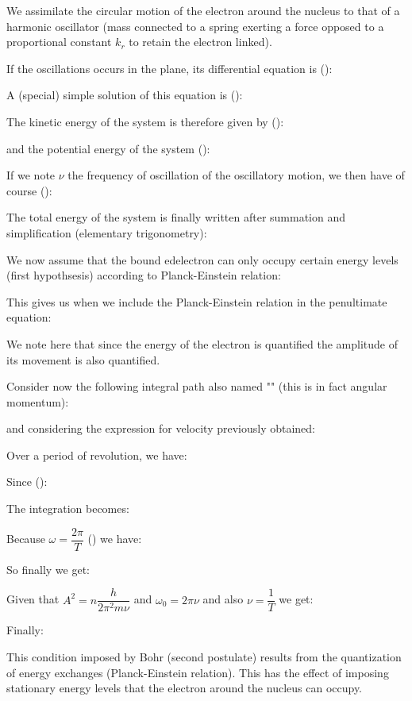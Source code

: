 We assimilate the circular motion of the electron around the nucleus to that of a harmonic oscillator (mass connected to a spring exerting a force opposed to a proportional constant $k_r$ to retain the  electron linked).

If the oscillations occurs in the plane, its differential equation is ():
	
A (special) simple solution of this equation is ():
	
The kinetic energy of the system is therefore given  by ():
	
and the potential energy of the system ():
	
If we note $\nu$ the frequency of oscillation of the oscillatory motion, we then have of course ():
	
The total energy of the system is finally written after summation and simplification (elementary trigonometry):
	
We now assume that the bound edelectron can only occupy certain energy levels (first hypothsesis) according to Planck-Einstein relation:
	
This gives us when we include the Planck-Einstein relation in the penultimate equation:
	
We note here that since the energy of the electron is quantified the amplitude of its movement is also quantified.

Consider now the following integral path also named "" (this is in fact angular momentum):
	
and considering the expression  for velocity previously obtained:
	
Over a period of revolution, we have:
	
Since ():
	
The integration becomes:
	
Because $\omega=\dfrac{2\pi}{T}$ () we have:
	
So finally we get:
	
Given that $A^2=n\dfrac{h}{2\pi^2m\nu}$ and $\omega_0=2\pi\nu$ and also $\nu=\dfrac{1}{T}$ we get:
	
Finally:
	
This condition imposed by Bohr (second postulate) results from the quantization of energy exchanges (Planck-Einstein relation). This has the effect of imposing stationary energy levels that the electron around the nucleus can occupy.

